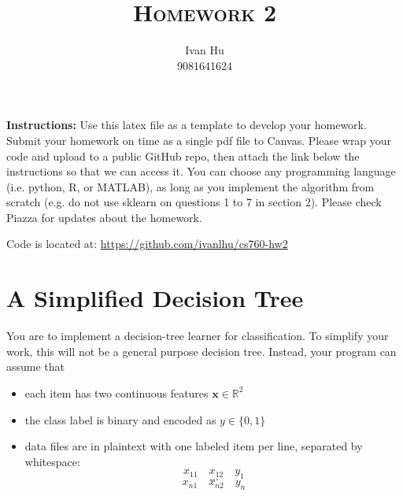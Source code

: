 \documentclass[a4paper]{article}
\title{\textsc{Homework 2}} %
\author{
Ivan Hu \\
9081641624\\
}
\date{}
\theoremstyle{definition}
\newcommand{\RR}{\mathbb{R}}
\def\x{\mathbf x}
\newenvironment{soln}{
    \leavevmode\color{blue}\ignorespaces
}{}
\begin{document}
\maketitle


\textbf{Instructions:}
Use this latex file as a template to develop your homework. Submit your homework on time as a single pdf file to Canvas. Please wrap your code and upload to a public GitHub repo, then attach the link below the instructions so that we can access it. You can choose any programming language (i.e. python, R, or MATLAB), as long as you implement the algorithm from scratch (e.g. do not use sklearn on questions 1 to 7 in section 2). Please check Piazza for updates about the homework.

\begin{soln}
  Code is located at: \href{https://github.com/ivanlhu/cs760-hw2}{https://github.com/ivanlhu/cs760-hw2}
\end{soln}

\section{A Simplified Decision Tree}
You are to implement a decision-tree learner for classification.
To simplify your work, this will not be a general purpose decision tree.  Instead, your program can assume that
\begin{itemize}
\item each item has two continuous features $\x \in \RR^2$
\item the class label is binary and encoded as $y \in \{0,1\}$
\item data files are in plaintext with one labeled item per line, separated by whitespace:
$$x_{11} \quad x_{12} \quad y_1$$
$$...$$
$$x_{n1} \quad x_{n2} \quad y_n$$
\end{itemize}
\end{document}
